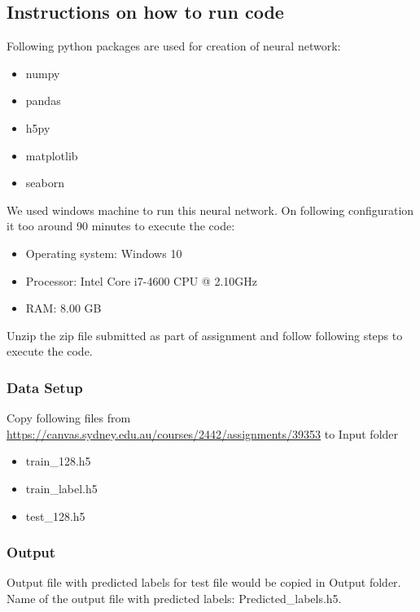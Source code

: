 \documentclass[fleqn,10pt]{SelfArx} %
\begin{document}
\subsection{Instructions on how to run code}
Following python packages are used for creation of neural network:
\begin{itemize}
\itemsep0em
  \item numpy
  \item pandas
  \item h5py
  \item matplotlib
  \item seaborn
\end{itemize}
We used windows machine to run this neural network. On following configuration it too around 90 minutes to execute the code:
\begin{itemize}
\itemsep0em
  \item Operating system: Windows 10
  \item Processor: Intel Core i7-4600 CPU @ 2.10GHz
  \item RAM: 8.00 GB
\end{itemize}
Unzip the zip file submitted as part of assignment and follow following steps to execute the code.
\subsubsection{Data Setup}
Copy following files from \url{https://canvas.sydney.edu.au/courses/2442/assignments/39353} to Input folder
\begin{itemize}
\itemsep0em
  \item train\_128.h5
  \item train\_label.h5
  \item test\_128.h5
\end{itemize}

\subsubsection{Output}
Output file with predicted labels for test file would be copied in Output folder. Name of the output file with predicted labels: Predicted\_labels.h5.
\end{document}
